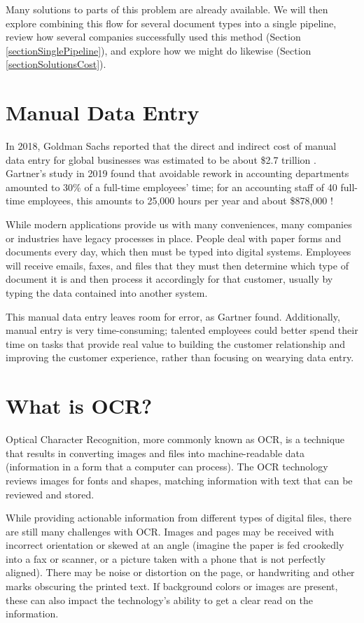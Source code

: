 \documentclass[conference]{IEEEtran}
\begin{document}
Many solutions to parts of this problem are already available. We will then explore combining this flow for several document types into a single pipeline, review how several companies successfully used this method (Section \ref{sectionSinglePipeline}), and explore how we might do likewise (Section \ref{sectionSolutionsCost}).

\section{Manual Data Entry} \label{sectionManualDataEntry}
In 2018, Goldman Sachs reported that the direct and indirect cost of manual data entry for global businesses was estimated to be about \$2.7 trillion \cite{schneider2018b2b}. Gartner's study in 2019 found that avoidable rework in accounting departments amounted to 30\% of a full-time employees' time; for an accounting staff of 40 full-time employees, this amounts to 25,000 hours per year and about \$878,000 \cite{lavelle2019gartner}!

While modern applications provide us with many conveniences, many companies or industries have legacy processes in place. People deal with paper forms and documents every day, which then must be typed into digital systems. Employees will receive emails, faxes, and files that they must then determine which type of document it is and then process it accordingly for that customer, usually by typing the data contained into another system.

This manual data entry leaves room for error, as Gartner found. Additionally, manual entry is very time-consuming; talented employees could better spend their time on tasks that provide real value to building the customer relationship and improving the customer experience, rather than focusing on wearying data entry.

\section{What is OCR?} \label{sectionOcr}
Optical Character Recognition, more commonly known as OCR, is a technique that results in converting images and files into machine-readable data (information in a form that a computer can process). The OCR technology reviews images for fonts and shapes, matching information with text that can be reviewed and stored.

While providing actionable information from different types of digital files, there are still many challenges with OCR. Images and pages may be received with incorrect orientation or skewed at an angle (imagine the paper is fed crookedly into a fax or scanner, or a picture taken with a phone that is not perfectly aligned). There may be noise or distortion on the page, or handwriting and other marks obscuring the printed text. If background colors or images are present, these can also impact the technology's ability to get a clear read on the information.
\end{document}
